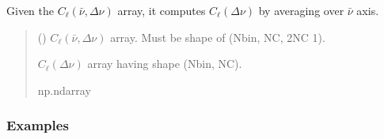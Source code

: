 \documentclass[a4paper,11pt,oneside,english,openany]{sphinxmanual}
\begin{document}
\begin{fulllineitems}
\label{\detokenize{clfuncs:clfuncs.cl_dnu}}
\pysigstartsignatures
{}
\pysigstopsignatures
\sphinxAtStartPar
Given the \(C_{\ell}(\bar{\nu},\Delta\nu)\) array, it computes \(C_{\ell}(\Delta\nu)\) by averaging over \(\bar{\nu}\) axis.
\begin{quote}\begin{description}
\sphinxAtStartPar
{} () \textendash{} \(C_{\ell}(\bar{\nu},\Delta\nu)\) array. Must be shape of (Nbin, NC, 2NC \sphinxhyphen{}1).

\sphinxAtStartPar
\(C_{\ell}(\Delta\nu)\) array having shape (Nbin, NC).

\sphinxAtStartPar
np.ndarray

\end{description}\end{quote}
\subsubsection*{Examples}

\begin{sphinxVerbatim}[commandchars=\\\{\}]
  
\end{sphinxVerbatim}

\end{fulllineitems}

\end{document}
